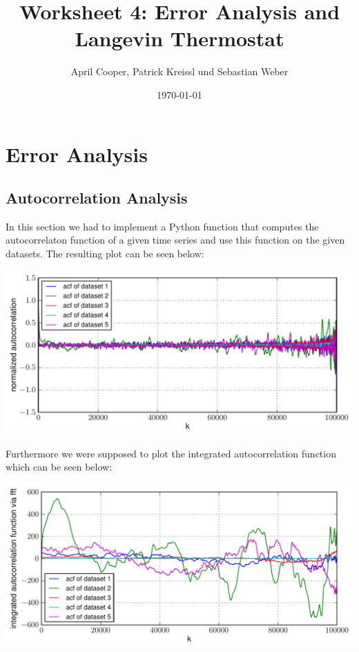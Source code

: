 \documentclass[12pt,a4paper]{scrartcl}
\author{April Cooper, Patrick Kreissl und Sebastian Weber}
\title{Worksheet 4: Error Analysis and Langevin
Thermostat}
\date{\today}
\begin{document}
\maketitle
\tableofcontents
\newpage

\section{Error Analysis}
\subsection{Autocorrelation Analysis}
In this section we had to implement a Python function that computes the autocorrelaton function of a given time series and use this function on the given datasets. The resulting plot can be seen below:


\begin{minipage}[hbt]{15cm}
	\centering
	\includegraphics[width=16cm]{../plots/acfplot.pdf}
\end{minipage}

Furthermore we were supposed to plot the integrated autocorrelation function which can be seen below:

\begin{minipage}[hbt]{15cm}
	\centering
	\includegraphics[width=16cm]{../plots/acfintplot.pdf}
\end{minipage}
\end{document}

